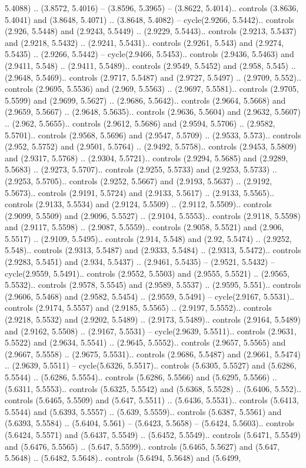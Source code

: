 5.4088) .. (3.8572, 5.4016) -- (3.8596, 5.3965) -- (3.8622, 5.4014).. controls (3.8636, 5.4041) and (3.8648, 5.4071) .. (3.8648, 5.4082) -- cycle(2.9266, 5.5442).. controls (2.926, 5.5448) and (2.9243, 5.5449) .. (2.9229, 5.5443).. controls (2.9213, 5.5437) and (2.9218, 5.5432) .. (2.9241, 5.5431).. controls (2.9261, 5.543) and (2.9274, 5.5435) .. (2.9266, 5.5442) -- cycle(2.9466, 5.5453).. controls (2.9436, 5.5463) and (2.9411, 5.548) .. (2.9411, 5.5489).. controls (2.9549, 5.5452) and (2.958, 5.545) .. (2.9648, 5.5469).. controls (2.9717, 5.5487) and (2.9727, 5.5497) .. (2.9709, 5.552).. controls (2.9695, 5.5536) and (2.969, 5.5563) .. (2.9697, 5.5581).. controls (2.9705, 5.5599) and (2.9699, 5.5627) .. (2.9686, 5.5642).. controls (2.9664, 5.5668) and (2.9659, 5.5667) .. (2.9648, 5.5635).. controls (2.9636, 5.5604) and (2.9632, 5.5607) .. (2.962, 5.5655).. controls (2.9612, 5.5686) and (2.9594, 5.5706) .. (2.9582, 5.5701).. controls (2.9568, 5.5696) and (2.9547, 5.5709) .. (2.9533, 5.573).. controls (2.952, 5.5752) and (2.9501, 5.5764) .. (2.9492, 5.5758).. controls (2.9453, 5.5809) and (2.9317, 5.5768) .. (2.9304, 5.5721).. controls (2.9294, 5.5685) and (2.9289, 5.5683) .. (2.9273, 5.5707).. controls (2.9255, 5.5733) and (2.9253, 5.5733) .. (2.9253, 5.5705).. controls (2.9252, 5.5667) and (2.9193, 5.5637) .. (2.9192, 5.5673).. controls (2.9191, 5.5724) and (2.9133, 5.5617) .. (2.9133, 5.5565).. controls (2.9133, 5.5534) and (2.9124, 5.5509) .. (2.9112, 5.5509).. controls (2.9099, 5.5509) and (2.9096, 5.5527) .. (2.9104, 5.5553).. controls (2.9118, 5.5598) and (2.9117, 5.5598) .. (2.9087, 5.5559).. controls (2.9058, 5.5521) and (2.906, 5.5517) .. (2.9109, 5.5495).. controls (2.914, 5.548) and (2.92, 5.5474) .. (2.9252, 5.548).. controls (2.9313, 5.5487) and (2.9333, 5.5484) .. (2.9313, 5.5472).. controls (2.9283, 5.5451) and (2.934, 5.5437) .. (2.9461, 5.5435) -- (2.9521, 5.5432) -- cycle(2.9559, 5.5491).. controls (2.9552, 5.5503) and (2.9555, 5.5521) .. (2.9565, 5.5532).. controls (2.9578, 5.5545) and (2.9589, 5.5537) .. (2.9595, 5.551).. controls (2.9606, 5.5468) and (2.9582, 5.5454) .. (2.9559, 5.5491) -- cycle(2.9167, 5.5531).. controls (2.9174, 5.5557) and (2.9185, 5.5565) .. (2.9197, 5.5552).. controls (2.9218, 5.5532) and (2.9202, 5.5489) .. (2.9173, 5.5489).. controls (2.9164, 5.5489) and (2.9162, 5.5508) .. (2.9167, 5.5531) -- cycle(2.9639, 5.5511).. controls (2.9631, 5.5522) and (2.9634, 5.5541) .. (2.9645, 5.5552).. controls (2.9657, 5.5565) and (2.9667, 5.5558) .. (2.9675, 5.5531).. controls (2.9686, 5.5487) and (2.9661, 5.5474) .. (2.9639, 5.5511) -- cycle(5.6326, 5.5517).. controls (5.6305, 5.5527) and (5.6286, 5.5544) .. (5.6286, 5.5554).. controls (5.6286, 5.5566) and (5.6295, 5.5566) .. (5.6311, 5.5553).. controls (5.6325, 5.5542) and (5.6368, 5.5528) .. (5.6406, 5.552).. controls (5.6465, 5.5509) and (5.647, 5.5511) .. (5.6436, 5.5531).. controls (5.6413, 5.5544) and (5.6393, 5.5557) .. (5.639, 5.5559).. controls (5.6387, 5.5561) and (5.6393, 5.5584) .. (5.6404, 5.561) -- (5.6423, 5.5658) -- (5.6424, 5.5603).. controls (5.6424, 5.5571) and (5.6437, 5.5549) .. (5.6452, 5.5549).. controls (5.6471, 5.5549) and (5.6476, 5.5565) .. (5.647, 5.5599).. controls (5.6465, 5.5627) and (5.647, 5.5648) .. (5.6482, 5.5648).. controls (5.6494, 5.5648) and (5.6499, 